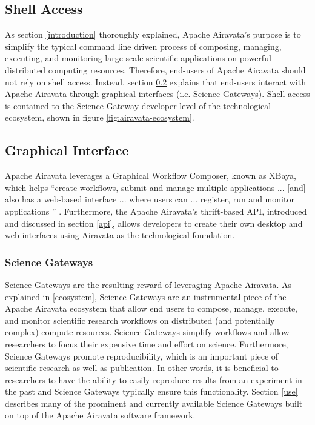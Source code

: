 \documentclass[9pt,twocolumn,twoside]{styles/osajnl}
\begin{document}
\subsection{Shell Access} \label{shell}
As section \ref{introduction} thoroughly explained, Apache Airavata's
purpose is to simplify the typical command line driven process of
composing, managing, executing, and monitoring large-scale scientific
applications on powerful distributed computing resources. Therefore,
end-users of Apache Airavata should not rely on shell access. Instead,
section \ref{graphical} explains that end-users interact with Apache
Airavata through graphical interfaces (i.e. Science Gateways). Shell
access is contained to the Science Gateway developer level of the
technological ecosystem, shown in figure \ref{fig:airavata-ecosystem}.

\subsection{Graphical Interface} \label{graphical}
Apache Airavata leverages a Graphical Workflow Composer, known as
XBaya, which helps ``create workflows, submit and manage multiple
applications ... [and] also has a web-based interface ... where users
can ... register, run and monitor applications ''
\cite{www-documentation}. Furthermore, the Apache Airavata's
thrift-based API, introduced and discussed in section \ref{api},
allows developers to create their own desktop and web interfaces using
Airavata as the technological foundation.

\subsubsection{Science Gateways} \label{science}
Science Gateways are the resulting reward of leveraging Apache
Airavata. As explained in \ref{ecosystem}, Science Gateways are an
instrumental piece of the Apache Airavata ecosystem that allow end
users to compose, manage, execute, and monitor scientific research
workflows on distributed (and potentially complex) compute
resources. Science Gateways simplify workflows and allow researchers
to focus their expensive time and effort on science. Furthermore,
Science Gateways promote reproducibility, which is an important piece
of scientific research as well as publication. In other words, it is
beneficial to researchers to have the ability to easily reproduce
results from an experiment in the past and Science Gateways typically
ensure this functionality. Section \ref{use} describes many of the
prominent and currently available Science Gateways built on top of the
Apache Airavata software framework.
\end{document}
